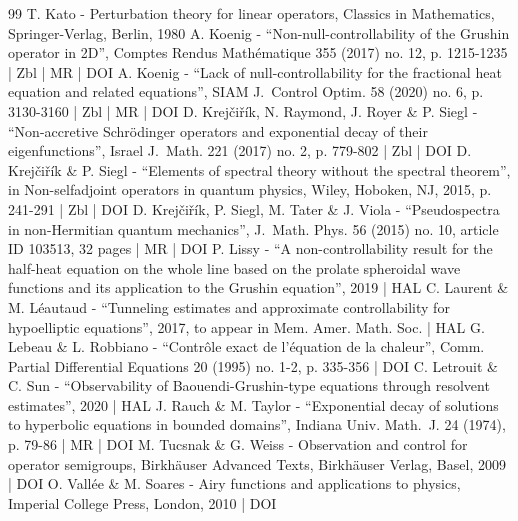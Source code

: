 \documentclass[10pt]{amsart}
\theoremstyle{plain}
\theoremstyle{definition}
\newcommand{\1}{\mathds 1}
\begin{document}
\begin{thebibliography}{99}
T. Kato - Perturbation theory for linear operators, Classics in Mathematics, Springer-Verlag, Berlin, 1980
A. Koenig - “Non-null-controllability of the Grushin operator in 2D”, Comptes Rendus Mathématique 355 (2017) no. 12, p. 1215-1235 | Zbl | MR | DOI
A. Koenig - “Lack of null-controllability for the fractional heat equation and related equations”, SIAM J. Control Optim. 58 (2020) no. 6, p. 3130-3160 | Zbl | MR | DOI
D. Krejčiřík, N. Raymond, J. Royer \& P. Siegl - “Non-accretive Schrödinger operators and exponential decay of their eigenfunctions”, Israel J. Math. 221 (2017) no. 2, p. 779-802 | Zbl | DOI
D. Krejčiřík \& P. Siegl - “Elements of spectral theory without the spectral theorem”, in Non-selfadjoint operators in quantum physics, Wiley, Hoboken, NJ, 2015, p. 241-291 | Zbl | DOI
D. Krejčiřík, P. Siegl, M. Tater \& J. Viola - “Pseudospectra in non-Hermitian quantum mechanics”, J. Math. Phys. 56 (2015) no. 10, article ID 103513, 32 pages | MR | DOI
P. Lissy - “A non-controllability result for the half-heat equation on the whole line based on the prolate spheroidal wave functions and its application to the Grushin equation”, 2019 | HAL
C. Laurent \& M. Léautaud - “Tunneling estimates and approximate controllability for hypoelliptic equations”, 2017, to appear in Mem. Amer. Math. Soc. | HAL
G. Lebeau \& L. Robbiano - “Contrôle exact de l’équation de la chaleur”, Comm. Partial Differential Equations 20 (1995) no. 1-2, p. 335-356 | DOI
C. Letrouit \& C. Sun - “Observability of Baouendi-Grushin-type equations through resolvent estimates”, 2020 | HAL
J. Rauch \& M. Taylor - “Exponential decay of solutions to hyperbolic equations in bounded domains”, Indiana Univ. Math. J. 24 (1974), p. 79-86 | MR | DOI
M. Tucsnak \& G. Weiss - Observation and control for operator semigroups, Birkhäuser Advanced Texts, Birkhäuser Verlag, Basel, 2009 | DOI
O. Vallée \& M. Soares - Airy functions and applications to physics, Imperial College Press, London, 2010 | DOI
\end{thebibliography}
\end{document}
